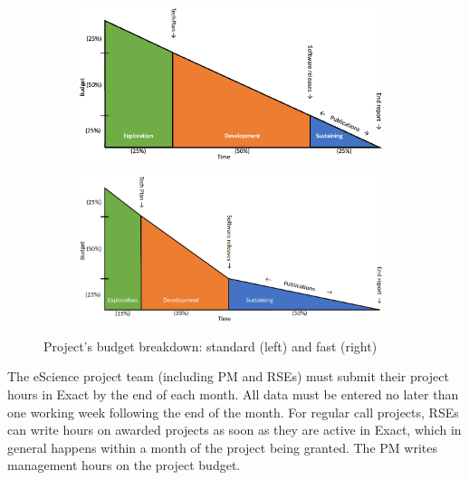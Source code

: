 \begin{figure}[t!]
    \centering
    \begin{subfigure}[b]{0.49\textwidth}
        \centering
        \includegraphics[width=0.97\textwidth]{img/budget-stages.png}
        \vspace{0.2cm}
    \end{subfigure}%
    \hfill
    \begin{subfigure}[b]{0.49\textwidth}
        \centering
        \includegraphics[width=0.97\textwidth]{img/budget-faster.png}
        \vspace{0.2cm}
    \end{subfigure}
    \caption{Project's budget breakdown: standard (left) and fast (right)}
    \label{fig:project-budget}
\end{figure}

The eScience project team (including PM and RSEs) must submit their project hours in Exact by the end of each month. All data must be entered no later than one working week following the end of the month. 
%
For regular call projects, RSEs can write hours on awarded projects as soon as they are active in Exact, which in general
happens within a month of the project being granted. The PM writes management hours on the project budget.

